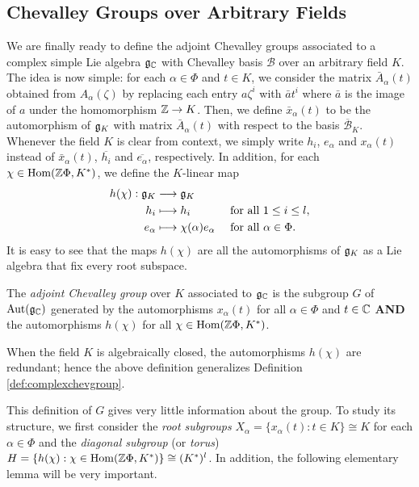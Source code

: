 \subsection{Chevalley Groups over Arbitrary Fields}

We are finally ready to define the adjoint Chevalley groups associated to a complex simple Lie algebra $\mathfrak{g}_{\mathbb{C}}$ with Chevalley basis $\mathcal{B}$ over an arbitrary field $K$. 
The idea is now simple: for each $\alpha\in\Phi$ and $t\in K$, we consider the matrix $\bar{A}_\alpha(t)$ obtained from $A_\alpha(\zeta)$ by replacing each entry $a\zeta^i$ with $\bar{a}t^i$ where $\bar{a}$ is the image of $a$ under the homomorphism $\mathbb{Z}\to K$. 
Then, we define $\bar{x}_\alpha(t)$ to be the automorphism of $\mathfrak{g}_K$ with matrix $\bar{A}_\alpha(t)$ with respect to the basis $\overline{\mathcal{B}}_K$. Whenever the field $K$ is clear from context, we simply write $h_i$, $e_\alpha$ and $x_\alpha(t)$ instead of $\bar{x}_\alpha(t)$, $\overline{h_i}$ and $\overline{e_\alpha}$, respectively. In addition, for each $\chi\in\mathrm{Hom}(\mathbb{Z}\Phi,K^*)$, we define the $K$-linear map
\begin{align*}
    h(\chi):\mathfrak{g}_K& \longrightarrow\mathfrak{g}_K\\
    h_i & \longmapsto h_i\hspace{1.23cm} \text{for all } 1\leq i \leq l,\\
    e_\alpha & \longmapsto \chi(\alpha) e_\alpha \quad\text{ for all } \alpha\in\Phi.
\end{align*}
It is easy to see that the maps $h(\chi)$ are all the automorphisms of $\mathfrak{g}_K$ as a Lie algebra that fix every root subspace.

\begin{definition}\label{def:chevgroup}
    The \textit{adjoint Chevalley group} over $K$ associated to $\mathfrak{g}_{\mathbb{C}}$ is the subgroup $G$ of $\mathrm{Aut}(\mathfrak{g}_{\mathbb{C}})$ generated by the automorphisms $x_\alpha(t)$ for all $\alpha\in\Phi$ and $t\in\mathbb{C}$ \textbf{AND} the automorphisms $h(\chi)$ for all $\chi\in\mathrm{Hom}(\mathbb{Z}\Phi, K^*)$.
\end{definition}

When the field $K$ is algebraically closed, the automorphisms $h(\chi)$ are redundant; hence the above definition generalizes Definition \ref{def:complexchevgroup}.

This definition of $G$ gives very little information about the group. To study its structure, we first consider the \textit{root subgroups} $X_\alpha=\{x_\alpha(t):t\in K\}\cong K$ for each $\alpha\in\Phi$ and the \textit{diagonal subgroup} (or \textit{torus}) $H=\{h(\chi):\chi\in\mathrm{Hom}(\mathbb{Z}\Phi,K^*)\}\cong (K^*)^l$. In addition, the following elementary lemma will be very important. 

